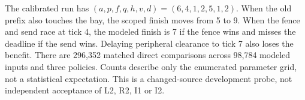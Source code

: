 \documentclass[11pt]{article}
\begin{document}
The calibrated run has $(a,p,f,q,h,v,d)=(6,4,1,2,5,1,2)$.
When the old prefix also touches the bay, the scoped finish moves from
5 to 9. When the fence and send race at tick 4, the modeled finish is 7
if the fence wins and misses the deadline if the send wins. Delaying
peripheral clearance to tick 7 also loses the benefit. There are 296,352
matched direct comparisons across 98,784 modeled inputs and three
policies. Counts describe only the enumerated parameter grid, not a
statistical expectation. This is a changed-source development probe,
not independent acceptance of L2, R2, I1 or I2.
\end{document}
